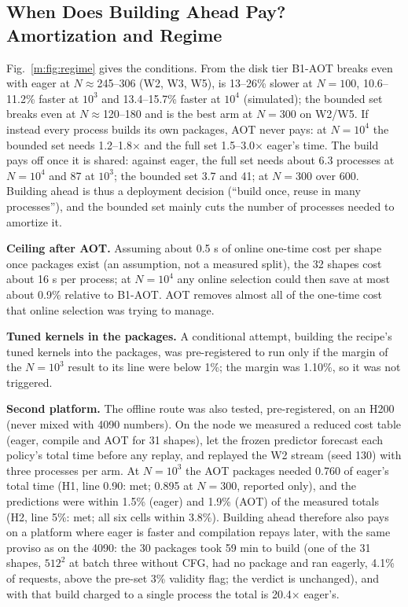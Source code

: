 \documentclass[conference]{IEEEtran}
\newcommand{\tn}[1]{#1}%
\begin{document}
\subsection{When Does Building Ahead Pay? Amortization and Regime}
Fig.~\ref{m:fig:regime} gives the conditions. From the disk tier B1-AOT breaks even with eager at $N{\approx}$\tn{245--306} (W2, W3, W5), is \tn{13--26\%} slower at $N{=}100$, \tn{10.6--11.2\%} faster at $10^3$ and \tn{13.4--15.7\%} faster at $10^4$ (simulated); the bounded set breaks even at $N{\approx}$\tn{120--180} and is the best arm at $N{=}300$ on W2/W5. If instead every process builds its own packages, AOT never pays: at $N{=}10^4$ the bounded set needs \tn{1.2--1.8}$\times$ and the full set \tn{1.5--3.0}$\times$ eager's time. The build pays off once it is shared: against eager, the full set needs about \tn{6.3} processes at $N{=}10^4$ and \tn{87} at $10^3$; the bounded set \tn{3.7} and \tn{41}; at $N{=}300$ over 600. Building ahead is thus a deployment decision (``build once, reuse in many processes''), and the bounded set mainly cuts the number of processes needed to amortize it.

\textbf{Ceiling after AOT.} Assuming about \tn{0.5 s} of online one-time cost per shape once packages exist (an assumption, not a measured split), the 32 shapes cost about \tn{16 s} per process; at $N{=}10^4$ any online selection could then save at most about \tn{0.9\%} relative to B1-AOT. AOT removes almost all of the one-time cost that online selection was trying to manage.

\textbf{Tuned kernels in the packages.} A conditional attempt, building the recipe's tuned kernels into the packages, was pre-registered to run only if the margin of the $N{=}10^3$ result to its line were below 1\%; the margin was \tn{1.10\%}, so it was not triggered.

\textbf{Second platform.} The offline route was also tested, pre-registered, on an H200 (never mixed with 4090 numbers). On the node we measured a reduced cost table (eager, compile and AOT for 31 shapes), let the frozen predictor forecast each policy's total time before any replay, and replayed the W2 stream (seed 130) with three processes per arm. At $N{=}10^3$ the AOT packages needed \tn{0.760} of eager's total time (H1, line 0.90: met; \tn{0.895} at $N{=}300$, reported only), and the predictions were within \tn{1.5\%} (eager) and \tn{1.9\%} (AOT) of the measured totals (H2, line 5\%: met; all six cells within \tn{3.8\%}). Building ahead therefore also pays on a platform where eager is faster and compilation repays later, with the same proviso as on the 4090: the 30 packages took \tn{59 min} to build (one of the 31 shapes, $512^2$ at batch three without CFG, had no package and ran eagerly, \tn{4.1\%} of requests, above the pre-set 3\% validity flag; the verdict is unchanged), and with that build charged to a single process the total is \tn{20.4}$\times$ eager's.
\end{document}

